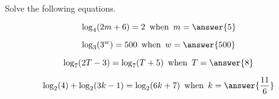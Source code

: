 \documentclass{ximera}
\author{Lee Wayand}
\begin{document}
\begin{exercise}





Solve the following equations.



\begin{question}  



\[
\log_{4}(2 m + 6) = 2  \, \text{ when } \, m = \answer{5}
\]


\end{question}






\begin{question}  



\[
\log_{3}(3^w) = 500  \, \text{ when } \, w = \answer{500}
\]


\end{question}






\begin{question}  



\[
\log_{7}(2T - 3) = \log_{7}(T + 5) \, \text{ when } \, T = \answer{8}
\]


\end{question}







\begin{question}  



\[
\log_{2}(4) + \log_{2}(3k - 1)  = \log_{2}(6k + 7) \, \text{ when } \, k = \answer{\frac{11}{6}}
\]


\end{question}










\end{exercise}
\end{document}
